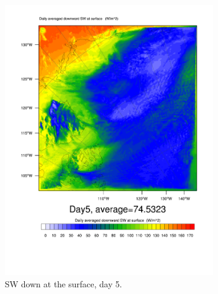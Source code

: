 \begin{figure}
\centering
	\begin{subfigure}{0.48\textwidth}
		\includegraphics[width=\textwidth]{results/control/SWDOWN_Day5.pdf}
		\caption{SW down at the surface, day 5.}
		\label{subfig:swdown_r1Day5}
	\end{subfigure}
	\quad
	\begin{subfigure}{0.48\textwidth}
		\centering

\end{subfigure}
\end{figure}
